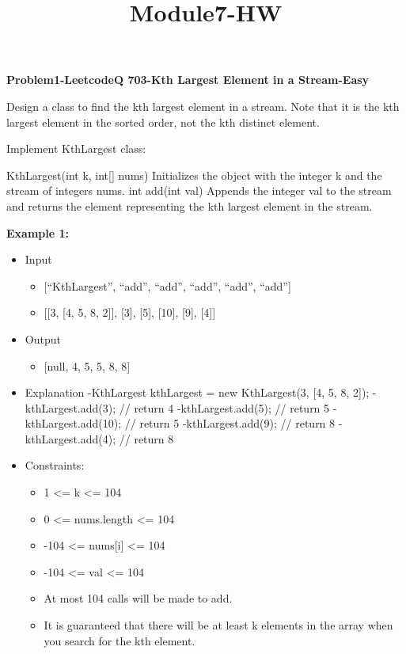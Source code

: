 \documentclass[11pt]{article}
\title{Module7-HW}
\providecommand{\tightlist}{%
      \setlength{\itemsep}{0pt}\setlength{\parskip}{0pt}}
\begin{document}
    
    \maketitle
    
    

    
    \textbf{Problem1-LeetcodeQ 703-Kth Largest Element in a Stream-Easy}

Design a class to find the kth largest element in a stream. Note that it
is the kth largest element in the sorted order, not the kth distinct
element.

Implement KthLargest class:

KthLargest(int k, int{[}{]} nums) Initializes the object with the
integer k and the stream of integers nums. int add(int val) Appends the
integer val to the stream and returns the element representing the kth
largest element in the stream.

\textbf{Example 1:}

\begin{itemize}
\item
  Input

  \begin{itemize}
  \tightlist
  \item
    {[}``KthLargest'', ``add'', ``add'', ``add'', ``add'', ``add''{]}
  \item
    {[}{[}3, {[}4, 5, 8, 2{]}{]}, {[}3{]}, {[}5{]}, {[}10{]}, {[}9{]},
    {[}4{]}{]}
  \end{itemize}
\item
  Output

  \begin{itemize}
  \tightlist
  \item
    {[}null, 4, 5, 5, 8, 8{]}
  \end{itemize}
\item
  Explanation -KthLargest kthLargest = new KthLargest(3, {[}4, 5, 8,
  2{]}); -kthLargest.add(3); // return 4 -kthLargest.add(5); // return 5
  -kthLargest.add(10); // return 5 -kthLargest.add(9); // return 8
  -kthLargest.add(4); // return 8
\item
  Constraints:

  \begin{itemize}
  \tightlist
  \item
    1 \textless= k \textless= 104
  \item
    0 \textless= nums.length \textless= 104
  \item
    -104 \textless= nums{[}i{]} \textless= 104
  \item
    -104 \textless= val \textless= 104
  \item
    At most 104 calls will be made to add.
  \item
    It is guaranteed that there will be at least k elements in the array
    when you search for the kth element.
  \end{itemize}
\end{itemize}
\end{document}
